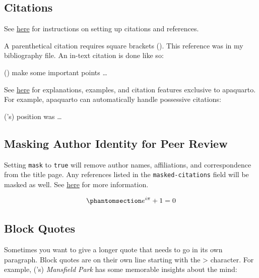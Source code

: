 \documentclass[
  letterpaper,
  DIV=11,
  numbers=noendperiod,
  oneside]{scrartcl}
\begin{document}
\subsection{Citations}\label{citations}

See
\href{https://quarto.org/docs/authoring/footnotes-and-citations.html}{here}
for instructions on setting up citations and references.

A parenthetical citation requires square brackets
(). This
reference was in my bibliography file. An in-text citation is done like
so:

() make
some important points \ldots{}

See
\href{https://wjschne.github.io/apaquarto/writing.html\#references}{here}
for explanations, examples, and citation features exclusive to
apaquarto. For example, apaquarto can automatically handle possessive
citations:

('s)
position was \ldots{}

\subsection{Masking Author Identity for Peer
Review}\label{masking-author-identity-for-peer-review}

Setting \texttt{mask} to \texttt{true} will remove author names,
affiliations, and correspondence from the title page. Any references
listed in the \texttt{masked-citations} field will be masked as well.
See
\href{https://wjschne.github.io/apaquarto/writing.html\#masked-citations-for-anonymous-peer-review}{here}
for more information.

\begin{equation}\phantomsection\label{eq-euler}{
e^{i\pi}+1=0
}\end{equation}

\subsection{Block Quotes}\label{block-quotes}

Sometimes you want to give a longer quote that needs to go in its own
paragraph. Block quotes are on their own line starting with the
\textgreater{} character. For example,
('s)
\emph{Mansfield Park} has some memorable insights about the mind:
\end{document}

